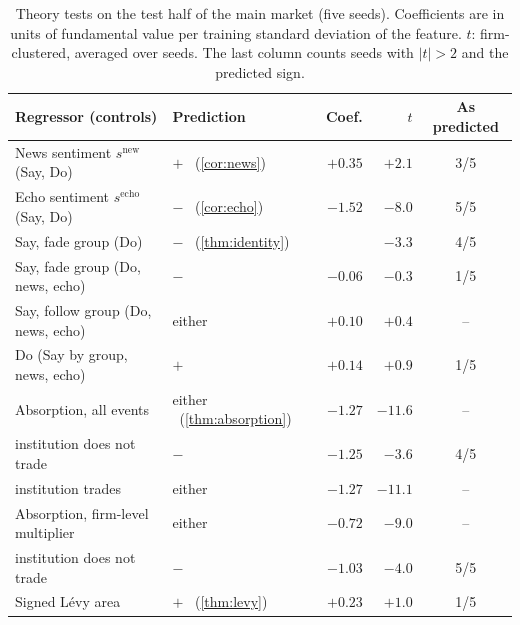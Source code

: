 \documentclass{article}
\theoremstyle{plain}
\theoremstyle{definition}
\theoremstyle{remark}
\begin{document}
\begin{table}[ht]
\centering
\caption{Theory tests on the test half of the main market (five seeds). Coefficients are in units of fundamental value per training standard deviation of the feature. $t$: firm-clustered, averaged over seeds. The last column counts seeds with $|t|>2$ and the predicted sign.}
\label{tab:tests}
\small
\begin{tabularx}{\textwidth}{@{}>{\raggedright\arraybackslash}Xlrrc@{}}
\toprule
Regressor (controls) & Prediction & Coef. & $t$ & As predicted \\
\midrule
News sentiment $s^{\text{new}}$ (Say, Do) & $+$ \ (\cref{cor:news}) & $+0.35$ & $+2.1$ & 3/5 \\
Echo sentiment $s^{\text{echo}}$ (Say, Do) & $-$ \ (\cref{cor:echo}) & $-1.52$ & $-8.0$ & 5/5 \\
\addlinespace
Say, fade group (Do) & $-$ \ (\cref{thm:identity}) & & $-3.3$ & 4/5 \\
Say, fade group (Do, news, echo) & $-$ & $-0.06$ & $-0.3$ & 1/5 \\
Say, follow group (Do, news, echo) & either & $+0.10$ & $+0.4$ & -- \\
Do (Say by group, news, echo) & $+$ & $+0.14$ & $+0.9$ & 1/5 \\
\addlinespace
Absorption, all events & either \ (\cref{thm:absorption}) & $-1.27$ & $-11.6$ & -- \\
\quad institution does not trade & $-$ & $-1.25$ & $-3.6$ & 4/5 \\
\quad institution trades & either & $-1.27$ & $-11.1$ & -- \\
Absorption, firm-level multiplier & either & $-0.72$ & $-9.0$ & -- \\
\quad institution does not trade & $-$ & $-1.03$ & $-4.0$ & 5/5 \\
\addlinespace
Signed L\'evy area & $+$ \ (\cref{thm:levy}) & $+0.23$ & $+1.0$ & 1/5 \\
\bottomrule
\end{tabularx}
\end{table}
\end{document}

